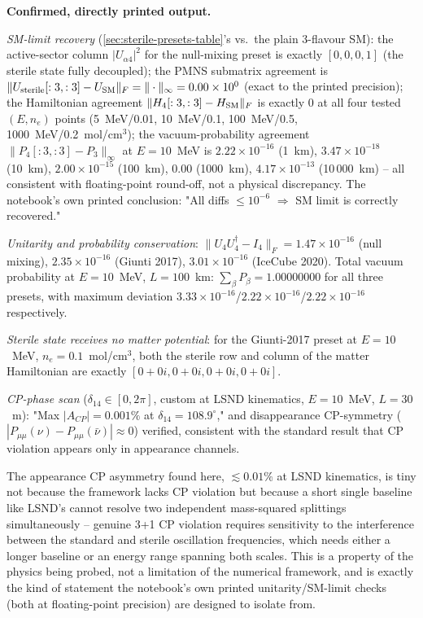 \begin{resultbox}
\textbf{Confirmed, directly printed output.}

\emph{SM-limit recovery} (\cref{sec:sterile-presets-table}'s
 vs.\ the plain 3-flavour SM): the
active-sector column $|U_{\alpha4}|^2$ for the null-mixing preset is
exactly $[0,0,0,1]$ (the sterile state fully decoupled); the PMNS
submatrix agreement is $\|U_{\rm sterile}[:3,:3]-U_{\rm SM}\|_F=\|\cdot\|_\infty=0.00\times10^{0}$
(exact to the printed precision); the Hamiltonian agreement
$\|H_4[:3,:3]-H_{\rm SM}\|_F$ is exactly $0$ at all four tested $(E,n_e)$
points (5~MeV/0.01, 10~MeV/0.1, 100~MeV/0.5, 1000~MeV/0.2~mol/cm$^3$); the
vacuum-probability agreement $\|P_4[:3,:3]-P_3\|_\infty$ at $E=10$~MeV is
$2.22\times10^{-16}$ (1~km), $3.47\times10^{-18}$ (10~km),
$2.00\times10^{-15}$ (100~km), $0.00$ (1000~km), $4.17\times10^{-13}$
(10\,000~km) -- all consistent with floating-point round-off, not a
physical discrepancy. The notebook's own printed conclusion: "All diffs
$\leq10^{-6}$ $\Rightarrow$ SM limit is correctly recovered."

\emph{Unitarity and probability conservation}: $\|U_4U_4^\dagger-I_4\|_F=1.47\times10^{-16}$
(null mixing), $2.35\times10^{-16}$ (Giunti 2017), $3.01\times10^{-16}$
(IceCube 2020). Total vacuum probability at $E=10$~MeV, $L=100$~km:
$\sum_\beta P_\beta=1.00000000$ for all three presets, with maximum
deviation $3.33\times10^{-16}$/$2.22\times10^{-16}$/$2.22\times10^{-16}$
respectively.

\emph{Sterile state receives no matter potential}: for the Giunti-2017
preset at $E=10$~MeV, $n_e=0.1$~mol/cm$^3$, both the sterile row and column
of the matter Hamiltonian are exactly $[0{+}0i,0{+}0i,0{+}0i,0{+}0i]$.

\emph{CP-phase scan} ($\delta_{14}\in[0,2\pi]$, custom
 at LSND kinematics, $E=10$~MeV,
$L=30$~m): "Max $|A_{CP}|=0.001\%$ at $\delta_{14}=108.9^\circ$," and
disappearance CP-symmetry ($|P_{\mu\mu}(\nu)-P_{\mu\mu}(\bar\nu)|\approx0$)
verified, consistent with the standard result that CP violation appears
only in appearance channels.
\end{resultbox}

\begin{notebox}
The appearance CP asymmetry found here, $\lesssim0.01\%$ at LSND
kinematics, is tiny not because the framework lacks CP violation but
because a short single baseline like LSND's cannot resolve two independent
mass-squared splittings simultaneously -- genuine 3+1 CP violation requires
sensitivity to the interference between the standard and sterile
oscillation frequencies, which needs either a longer baseline or an energy
range spanning both scales. This is a property of the physics being probed,
not a limitation of the numerical framework, and is exactly the kind of
statement the notebook's own printed unitarity/SM-limit checks (both at
floating-point precision) are designed to isolate from.
\end{notebox}

